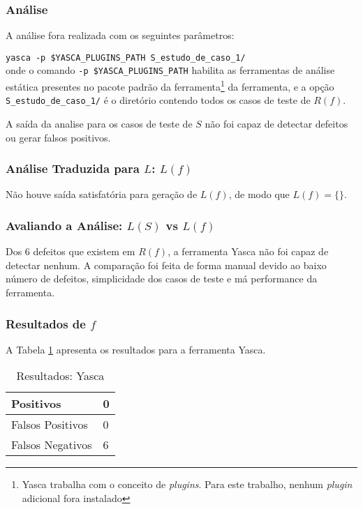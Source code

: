 \subsubsection{Análise}

A análise fora realizada com os seguintes parâmetros:

\lstinline[mathescape=false]{yasca -p $YASCA_PLUGINS_PATH S_estudo_de_caso_1/}\\
onde o comando \lstinline[mathescape=false]{-p $YASCA_PLUGINS_PATH} habilita as ferramentas de análise estática presentes no pacote padrão da ferramenta\footnote{Yasca trabalha com o conceito de \textit{plugins}. Para este trabalho, nenhum \textit{plugin} adicional fora instalado} da ferramenta, e a opção \lstinline{S_estudo_de_caso_1/} é o diretório contendo todos os casos de teste de $R(f)$.

A saída da analise para os casos de teste de $S$ não foi capaz de detectar defeitos ou gerar falsos positivos.

\subsubsection{Análise Traduzida para $L$: $L(f)$}

Não houve saída satisfatória para geração de $L(f)$, de modo que 
$L(f) = \lbrace\rbrace$.

\subsubsection{Avaliando a Análise: $L(S)$ vs $L(f)$}

Dos 6 defeitos que existem em $R(f)$, a ferramenta Yasca não foi capaz de detectar nenhum. A comparação foi feita de forma manual devido ao baixo número de defeitos, simplicidade dos casos de teste e má performance da ferramenta.

\subsubsection{Resultados de $f$}

A Tabela \ref{tabela_yasca} apresenta os resultados para a ferramenta Yasca.
\begin{table}[h]
\caption{Resultados: Yasca}
  \centering
\begin{tabular}{l | l}
  \hline
  Positivos & 0 \\ \hline
  Falsos Positivos & 0 \\ \hline
  Falsos Negativos & 6 \\
  \hline
\end{tabular}
\label{tabela_yasca}
\end{table}

